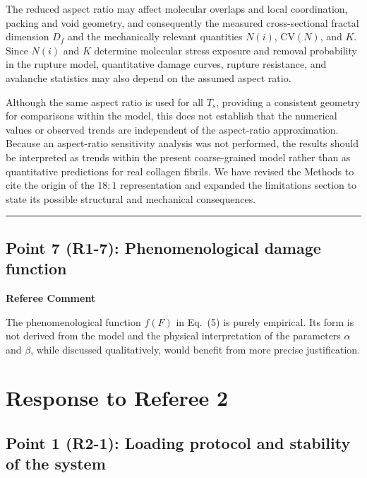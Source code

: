 \documentclass[11pt]{article}
\newenvironment{refereecomment}
  {%
    \par
    \begingroup
    \color{commentgray}
    \itshape
    \setlength{\leftskip}{1.4em}
    \setlength{\rightskip}{1.4em}
  }
  {%
    \par
    \endgroup
  }
\newcommand{\refereelabel}{%
  \par\smallskip
  {\color{commentgray}\bfseries Referee Comment}\par
}
\newcommand{\pointseparator}{%
  \par\bigskip
  {\color{rulegray}\hrule}
  \par\bigskip
}
\begin{document}
The reduced aspect ratio may affect molecular overlaps and local coordination,
packing and void geometry, and consequently the measured cross-sectional
fractal dimension \(D_f\) and the mechanically relevant quantities \(N(i)\),
\(\mathrm{CV}(N)\), and \(K\). Since \(N(i)\) and \(K\) determine molecular
stress exposure and removal probability in the rupture model, quantitative
damage curves, rupture resistance, and avalanche statistics may also depend on
the assumed aspect ratio.

Although the same aspect ratio is used for all \(T_s\), providing a consistent
geometry for comparisons within the model, this does not establish that the
numerical values or observed trends are independent of the aspect-ratio
approximation. Because an aspect-ratio sensitivity analysis was not performed,
the results should be interpreted as trends within the present coarse-grained
model rather than as quantitative predictions for real collagen fibrils. We
have revised the Methods to cite the origin of the \(18{:}1\) representation
and expanded the limitations section to state its possible structural and
mechanical consequences.

\pointseparator

\subsection*{Point 7 (R1-7): Phenomenological damage function}

\refereelabel
\begin{refereecomment}
The phenomenological function \(f(F)\) in Eq.~(5) is purely empirical. Its
form is not derived from the model and the physical interpretation of the
parameters \(\alpha\) and \(\beta\), while discussed qualitatively, would
benefit from more precise justification.
\end{refereecomment}

\clearpage
\section*{Response to Referee 2}

\subsection*{Point 1 (R2-1): Loading protocol and stability of the system}
\end{document}
